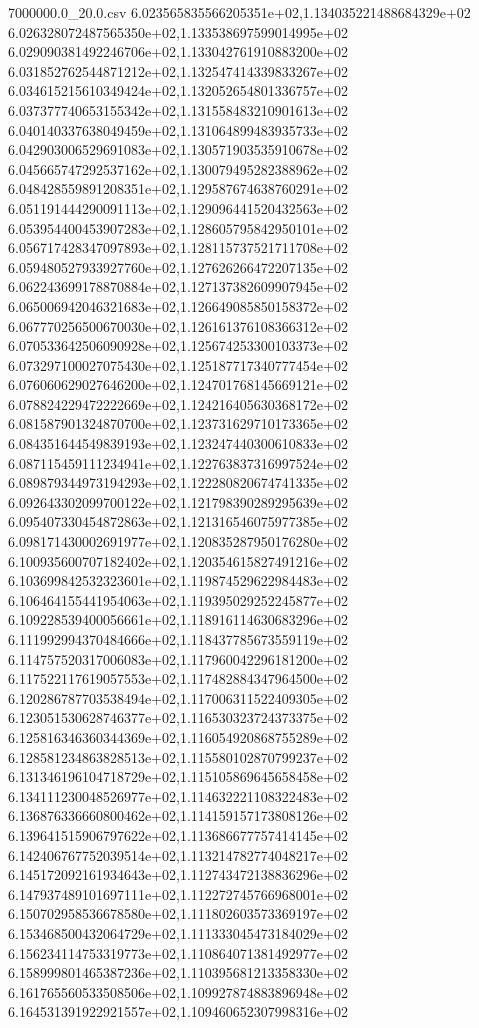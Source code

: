 \begin{filecontents*}{7000000.0_20.0.csv}
6.023565835566205351e+02,1.134035221488684329e+02
6.026328072487565350e+02,1.133538697599014995e+02
6.029090381492246706e+02,1.133042761910883200e+02
6.031852762544871212e+02,1.132547414339833267e+02
6.034615215610349424e+02,1.132052654801336757e+02
6.037377740653155342e+02,1.131558483210901613e+02
6.040140337638049459e+02,1.131064899483935733e+02
6.042903006529691083e+02,1.130571903535910678e+02
6.045665747292537162e+02,1.130079495282388962e+02
6.048428559891208351e+02,1.129587674638760291e+02
6.051191444290091113e+02,1.129096441520432563e+02
6.053954400453907283e+02,1.128605795842950101e+02
6.056717428347097893e+02,1.128115737521711708e+02
6.059480527933927760e+02,1.127626266472207135e+02
6.062243699178870884e+02,1.127137382609907945e+02
6.065006942046321683e+02,1.126649085850158372e+02
6.067770256500670030e+02,1.126161376108366312e+02
6.070533642506090928e+02,1.125674253300103373e+02
6.073297100027075430e+02,1.125187717340777454e+02
6.076060629027646200e+02,1.124701768145669121e+02
6.078824229472222669e+02,1.124216405630368172e+02
6.081587901324870700e+02,1.123731629710173365e+02
6.084351644549839193e+02,1.123247440300610833e+02
6.087115459111234941e+02,1.122763837316997524e+02
6.089879344973194293e+02,1.122280820674741335e+02
6.092643302099700122e+02,1.121798390289295639e+02
6.095407330454872863e+02,1.121316546075977385e+02
6.098171430002691977e+02,1.120835287950176280e+02
6.100935600707182402e+02,1.120354615827491216e+02
6.103699842532323601e+02,1.119874529622984483e+02
6.106464155441954063e+02,1.119395029252245877e+02
6.109228539400056661e+02,1.118916114630683296e+02
6.111992994370484666e+02,1.118437785673559119e+02
6.114757520317006083e+02,1.117960042296181200e+02
6.117522117619057553e+02,1.117482884347964500e+02
6.120286787703538494e+02,1.117006311522409305e+02
6.123051530628746377e+02,1.116530323724373375e+02
6.125816346360344369e+02,1.116054920868755289e+02
6.128581234863828513e+02,1.115580102870799237e+02
6.131346196104718729e+02,1.115105869645658458e+02
6.134111230048526977e+02,1.114632221108322483e+02
6.136876336660800462e+02,1.114159157173808126e+02
6.139641515906797622e+02,1.113686677757414145e+02
6.142406767752039514e+02,1.113214782774048217e+02
6.145172092161934643e+02,1.112743472138836296e+02
6.147937489101697111e+02,1.112272745766968001e+02
6.150702958536678580e+02,1.111802603573369197e+02
6.153468500432064729e+02,1.111333045473184029e+02
6.156234114753319773e+02,1.110864071381492977e+02
6.158999801465387236e+02,1.110395681213358330e+02
6.161765560533508506e+02,1.109927874883896948e+02
6.164531391922921557e+02,1.109460652307998316e+02

\end{filecontents*}
